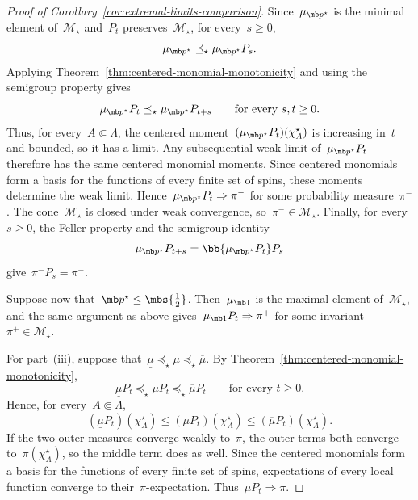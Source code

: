 \begin{proof}[Proof of Corollary~\ref{cor:extremal-limits-comparison}]
Since~$\mu_{\mb p^\star}$ is the minimal element of~$\mathcal M_\star$ and~$P_t$ preserves~$\mathcal M_\star$, for every~$s\geq0$,
\begin{equation*}
\mu_{\mb p^\star}
\preceq_\star
\mu_{\mb p^\star}P_s.
\end{equation*}
Applying Theorem~\ref{thm:centered-monomial-monotonicity} and using the
semigroup property gives
\begin{equation*}
\mu_{\mb p^\star}P_t
\preceq_\star
\mu_{\mb p^\star}P_{t+s}
\qquad
\text{for every }s,t\geq0.
\end{equation*}
Thus, for every~$A\Subset\Lambda$, the centered moment~$(\mu_{\mb p^\star}P_t)(\chi_A^\star)$ is increasing in~$t$ and bounded,
so it has a limit. Any subsequential weak limit of~$\mu_{\mb p^\star}P_t$ therefore has the same centered monomial moments.
Since centered monomials form a basis for the functions of every finite set of
spins, these moments determine the weak limit. Hence~$\mu_{\mb p^\star}P_t\Rightarrow\pi^-$ for some probability measure~$\pi^-$. The cone~$\mathcal M_\star$ is closed under weak convergence, so~$\pi^-\in\mathcal M_\star$. Finally, for every~$s\geq0$, the Feller
property and the semigroup identity
\begin{equation*}
\mu_{\mb p^\star}P_{t+s}
=
\bb{\mu_{\mb p^\star}P_t}P_s
\end{equation*}
give~$\pi^-P_s=\pi^-$.

Suppose now that~$\mb p^\star\leq\mbs{\tfrac12}$. Then~$\mu_{\mb1}$ is
the maximal element of~$\mathcal M_\star$, and the same
argument as above gives~$\mu_{\mb1}P_t\Rightarrow\pi^+$ for some invariant~$\pi^+\in\mathcal M_\star$.

For part~\textup{(iii)}, suppose that~$\underline\mu\preceq_\star\mu\preceq_\star\overline\mu$. By
Theorem~\ref{thm:centered-monomial-monotonicity},
\begin{equation*}
\underline\mu P_t
\preceq_\star
\mu P_t
\preceq_\star
\overline\mu P_t
\qquad
\text{for every }t\geq0.
\end{equation*}
Hence, for every~$A\Subset\Lambda$,
\begin{equation*}
(\underline\mu P_t)(\chi_A^\star)
\leq
(\mu P_t)(\chi_A^\star)
\leq
(\overline\mu P_t)(\chi_A^\star).
\end{equation*}
If the two outer measures converge weakly to~$\pi$, the outer terms both
converge to~$\pi(\chi_A^\star)$, so the middle term does as well. Since the
centered monomials form a basis for the functions of every finite set of spins,
expectations of every local function converge to their~$\pi$-expectation.
Thus~$\mu P_t\Rightarrow\pi$.
\end{proof}

